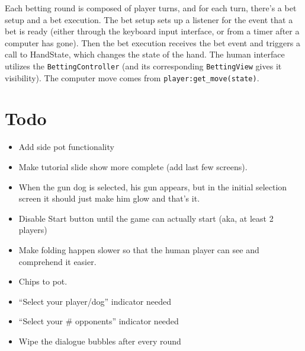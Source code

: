 \documentclass[10pt]{article}
\begin{document}
Each betting round is composed of player turns, and for each turn,
there's a bet setup and a bet execution. The bet setup sets up a
listener for the event that a bet is ready (either through the
keyboard input interface, or from a timer after a computer has
gone). Then the bet execution receives the bet event and triggers a
call to HandState, which changes the state of the hand. The human
interface utilizes the \verb^BettingController^ (and its corresponding
\verb^BettingView^ gives it visibility). The computer move comes from
\verb^player:get_move(state)^.

\section*{Todo}
\begin{itemize}
\item Add side pot functionality
\item Make tutorial slide show more complete (add last few screens).
\item When the gun dog is selected, his gun appears, but in the
  initial selection screen it should just make him glow and that's it.
\item Disable Start button until the game can actually start (aka, at
  least 2 players)
\item Make folding happen slower so that the human player can see and
  comprehend it easier.
\item Chips to pot.
\item ``Select your player/dog'' indicator needed
\item ``Select your \# opponents'' indicator needed
\item Wipe the dialogue bubbles after every round
\end{itemize}
\end{document}
